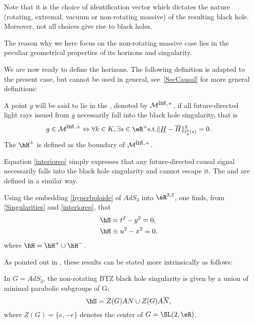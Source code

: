 Note that it is the choice of identification vector which dictates the nature (rotating, extremal, vacuum or non-rotating massive) of the resulting black hole. Moreover, not all choices give rise to black holes.

The reason why we here focus on the non-rotating massive case lies in the peculiar geometrical properties of its horizons and singularity.

We are now ready to define the horizons. The following definition is adapted to the present case, but cannot be used in general, see~\ref{SecCausal} for more general definitions:

\begin{definition}
	A point $g$ will be said to lie in the , denoted by ${\cal M}^{\mbox{int},+}$, if all future-directed light rays issued from $g$ necessarily fall into the black hole singularity, that is
	\begin{equation}\label{interioreq}
		g \in {\cal M}^{\mbox{int},+} \Leftrightarrow \forall k \in K, \exists s \in
		\eR^+  \mbox{s.t.}  \|\underline{H} - \overline{H}\|^2_{l^k_g (s)}=0.
	\end{equation}
	The  $\hH^+$ is defined as the boundary of ${\cal M}^{\mbox{int},+}$.
	\label{interior-horizons}
\end{definition}
Equation \eqref{interioreq} simply expresses that any future-directed causal signal necessarily falls into the black hole singularity and cannot escape it. The  and  are defined in a similar way.

Using the embedding \eqref{hyperboloide} of $AdS_3$ into $\eR^{2,2}$, one finds, from \eqref{Singularities} and \eqref{interioreq}, that
\begin{equation}		\label{BTZSingHor}
	\begin{aligned}[]
		\hS & \equiv t^2 - y^2 = 0, \\
		\hH & \equiv u^2 - x^2 = 0,
	\end{aligned}
\end{equation}
where $\hH = \hH^+ \cup \hH^-$.

As pointed out in \cite{Keio}, these results can be stated more intrinsically as follows:
\begin{proposition}
	In $G=AdS_3$, the non-rotating BTZ black hole singularity is given by a union of minimal parabolic subgroups of G:
	\begin{equation}
		\hS = Z(G) A N \cup Z(G) A \overline{N},
	\end{equation}
	where $Z(G)=\{e,-e\}$ denotes the center of $G=\SL(2,\eR)$.
	\label{BTZSing}
\end{proposition}

